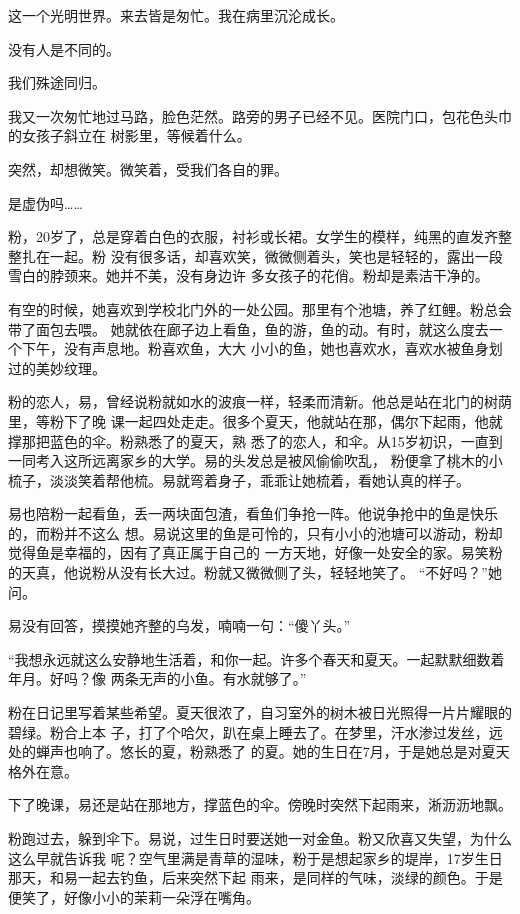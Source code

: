		这一个光明世界。来去皆是匆忙。我在病里沉沦成长。

		没有人是不同的。

		我们殊途同归。

		我又一次匆忙地过马路，脸色茫然。路旁的男子已经不见。医院门口，包花色头巾的女孩子斜立在
	树影里，等候着什么。

		突然，却想微笑。微笑着，受我们各自的罪。

		是虚伪吗……

	\endwriting



		粉，20岁了，总是穿着白色的衣服，衬衫或长裙。女学生的模样，纯黑的直发齐整整扎在一起。粉
	没有很多话，却喜欢笑，微微侧着头，笑也是轻轻的，露出一段雪白的脖颈来。她并不美，没有身边许
	多女孩子的花俏。粉却是素洁干净的。

		有空的时候，她喜欢到学校北门外的一处公园。那里有个池塘，养了红鲤。粉总会带了面包去喂。
	她就依在廊子边上看鱼，鱼的游，鱼的动。有时，就这么度去一个下午，没有声息地。粉喜欢鱼，大大
	小小的鱼，她也喜欢水，喜欢水被鱼身划过的美妙纹理。

		粉的恋人，易，曾经说粉就如水的波痕一样，轻柔而清新。他总是站在北门的树荫里，等粉下了晚
	课一起四处走走。很多个夏天，他就站在那，偶尔下起雨，他就撑那把蓝色的伞。粉熟悉了的夏天，熟
	悉了的恋人，和伞。从15岁初识，一直到一同考入这所远离家乡的大学。易的头发总是被风偷偷吹乱，
	粉便拿了桃木的小梳子，淡淡笑着帮他梳。易就弯着身子，乖乖让她梳着，看她认真的样子。

		易也陪粉一起看鱼，丢一两块面包渣，看鱼们争抢一阵。他说争抢中的鱼是快乐的，而粉并不这么
	想。易说这里的鱼是可怜的，只有小小的池塘可以游动，粉却觉得鱼是幸福的，因有了真正属于自己的
	一方天地，好像一处安全的家。易笑粉的天真，他说粉从没有长大过。粉就又微微侧了头，轻轻地笑了。
	“不好吗？”她问。

		易没有回答，摸摸她齐整的乌发，喃喃一句：“傻丫头。”

		“我想永远就这么安静地生活着，和你一起。许多个春天和夏天。一起默默细数着年月。好吗？像
	两条无声的小鱼。有水就够了。”

		粉在日记里写着某些希望。夏天很浓了，自习室外的树木被日光照得一片片耀眼的碧绿。粉合上本
	子，打了个哈欠，趴在桌上睡去了。在梦里，汗水渗过发丝，远处的蝉声也响了。悠长的夏，粉熟悉了
	的夏。她的生日在7月，于是她总是对夏天格外在意。

		下了晚课，易还是站在那地方，撑蓝色的伞。傍晚时突然下起雨来，淅沥沥地飘。

		粉跑过去，躲到伞下。易说，过生日时要送她一对金鱼。粉又欣喜又失望，为什么这么早就告诉我
	呢？空气里满是青草的湿味，粉于是想起家乡的堤岸，17岁生日那天，和易一起去钓鱼，后来突然下起
	雨来，是同样的气味，淡绿的颜色。于是便笑了，好像小小的茉莉一朵浮在嘴角。

